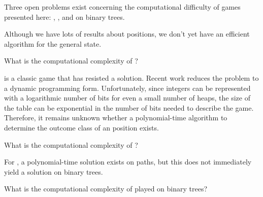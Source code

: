\documentclass[letter,10pt]{article}
\begin{document}
Three open problems exist concerning the computational difficulty of games presented here: , , and  on binary trees.

Although we have lots of results about  positions, we don't yet have an efficient algorithm for the general state.

\begin{openProblem}
    What is the computational complexity of ?
\end{openProblem}

 is a classic game that has resisted a solution.  Recent work reduces the problem to a dynamic programming form\cite{arXiv:1506.01042v1}.  Unfortunately, since integers can be represented with a logarithmic number of bits for even a small number of heaps, the size of the table can be exponential in the number of bits needed to describe the game. Therefore, it remains unknown whether a polynomial-time algorithm to determine the outcome class of an  position exists.

\begin{openProblem}[Antonim]
    What is the computational complexity of ?
\end{openProblem}

For , a polynomial-time solution exists on paths, but this does not immediately yield a solution on binary trees.

\begin{openProblem}
    What is the computational complexity of  played on binary trees?
\end{openProblem}
\end{document}

